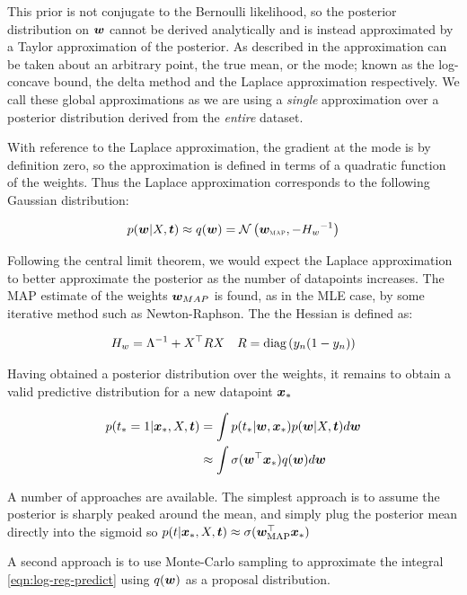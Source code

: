 This prior is not conjugate to the Bernoulli likelihood, so the posterior distribution on $\bm w$ cannot be derived analytically and is instead approximated by a Taylor approximation of the posterior. As described in \cite{Wang2013} the approximation can be taken about an arbitrary point, the true mean, or the mode; known as the log-concave bound, the delta method and the Laplace approximation respectively. We call these global approximations as we are using a \emph{single} approximation over a posterior distribution derived from the \emph{entire} dataset.

With reference to the Laplace approximation, the gradient at the mode is by definition zero, so the approximation is defined in terms of a quadratic function of the weights. Thus the Laplace approximation corresponds to the following Gaussian distribution:

\begin{equation}
p(\bm w|X,\bm t) \approx q(\bm w) = \mathcal{N} \left( {\bm w_{\text{\tiny \sc MAP}}}, {-{H_w}^{-1}} \right)
\end{equation}

Following the central limit theorem, we would expect the Laplace approximation to better approximate the posterior as the number of datapoints increases. The MAP estimate of the weights $\bm w_{MAP}$ is found, as in the MLE case, by some iterative method such as Newton-Raphson. The the Hessian is defined as:

\begin{align}
H_w   & = {\Lambda}^{-1} + X^\top R X & R = \text{diag} \left( {y_n(1 - y_n)} \right) 
\end{align}

Having obtained a posterior distribution over the weights, it remains to obtain a valid predictive distribution for a new datapoint $\bm x_*$

\begin{align}
p(t_* = 1| \bm x_*, X, \bm t) & = \int p(t_*|\bm w, \bm x_*)p(\bm w|X,\bm t) d\bm w \label{eqn:log-reg-predict} \\
 & \approx \int \sigma(\bm w^\top\bm x_*)q(\bm w) d\bm w \label{eqn:log-reg-predict-approx-q}
\end{align}

A number of approaches are available. The simplest approach is to assume the posterior is sharply peaked around the mean, and simply plug the posterior mean directly into the sigmoid so $p(t|\bm x_*, X, \bm t) \approx \sigma(\bm w_{\text{MAP}}^\top \bm x_*)$

A second approach is to use Monte-Carlo sampling to approximate the integral \eqref{eqn:log-reg-predict} using $q(\bm w)$ as a proposal distribution.

